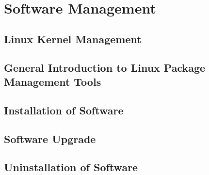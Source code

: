 \chapter{Software Management}


\section{Linux Kernel Management}

\section{General Introduction to Linux Package Management Tools}

\section{Installation of Software}

\section{Software Upgrade}

\section{Uninstallation of Software}
















